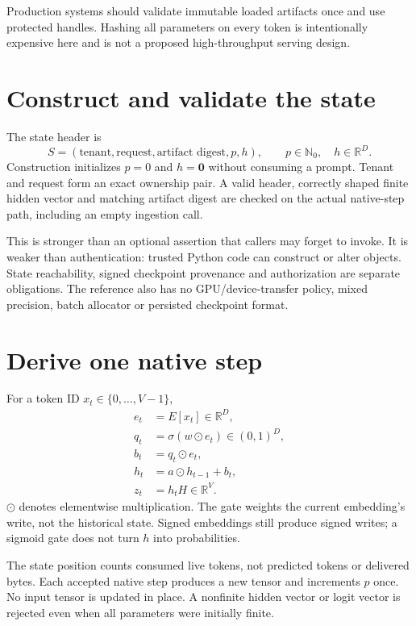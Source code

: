 Production systems should validate immutable loaded artifacts once and use
protected handles. Hashing all parameters on every token is intentionally
expensive here and is not a proposed high-throughput serving design.

\section{Construct and validate the state}
The state header is
\[
 S=(\text{tenant},\text{request},\text{artifact digest},p,h),
 \qquad p\in\mathbb N_0,\quad h\in\mathbb R^D.
\]
Construction initializes $p=0$ and $h=\mathbf0$ without consuming a prompt.
Tenant and request form an exact ownership pair. A valid header, correctly
shaped finite hidden vector and matching artifact digest are checked on the
actual native-step path, including an empty ingestion call.

This is stronger than an optional assertion that callers may forget to invoke.
It is weaker than authentication: trusted Python code can construct or alter
objects. State reachability, signed checkpoint provenance and authorization are
separate obligations. The reference also has no GPU/device-transfer policy,
mixed precision, batch allocator or persisted checkpoint format.

\section{Derive one native step}
For a token ID $x_t\in\{0,\ldots,V-1\}$,
\begin{align}
 e_t&=E[x_t]\in\mathbb R^D,\\
 q_t&=\sigma(w\odot e_t)\in(0,1)^D,\\
 b_t&=q_t\odot e_t,\\
 h_t&=a\odot h_{t-1}+b_t,\\
 z_t&=h_tH\in\mathbb R^V.
 \label{eq:evo31-step}
\end{align}
$\odot$ denotes elementwise multiplication. The gate weights the current
embedding's write, not the historical state. Signed embeddings still produce
signed writes; a sigmoid gate does not turn $h$ into probabilities.

The state position counts consumed live tokens, not predicted tokens or
delivered bytes. Each accepted native step produces a new tensor and increments
$p$ once. No input tensor is updated in place. A nonfinite hidden vector or
logit vector is rejected even when all parameters were initially finite.

